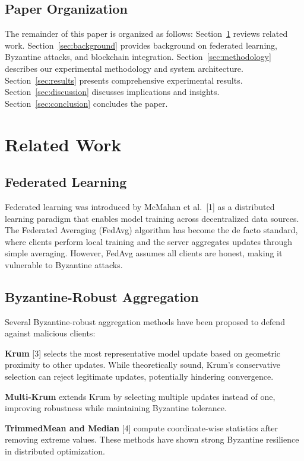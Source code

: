 \documentclass[12pt,a4paper,onecolumn]{article}
\begin{document}
\subsection{Paper Organization}

The remainder of this paper is organized as follows: Section~\ref{sec:related} reviews related work. Section~\ref{sec:background} provides background on federated learning, Byzantine attacks, and blockchain integration. Section~\ref{sec:methodology} describes our experimental methodology and system architecture. Section~\ref{sec:results} presents comprehensive experimental results. Section~\ref{sec:discussion} discusses implications and insights. Section~\ref{sec:conclusion} concludes the paper.

\section{Related Work}
\label{sec:related}

\subsection{Federated Learning}

Federated learning was introduced by McMahan et al.~[1] as a distributed learning paradigm that enables model training across decentralized data sources. The Federated Averaging (FedAvg) algorithm has become the de facto standard, where clients perform local training and the server aggregates updates through simple averaging. However, FedAvg assumes all clients are honest, making it vulnerable to Byzantine attacks.

\subsection{Byzantine-Robust Aggregation}

Several Byzantine-robust aggregation methods have been proposed to defend against malicious clients:

\textbf{Krum} [3] selects the most representative model update based on geometric proximity to other updates. While theoretically sound, Krum's conservative selection can reject legitimate updates, potentially hindering convergence.

\textbf{Multi-Krum} extends Krum by selecting multiple updates instead of one, improving robustness while maintaining Byzantine tolerance.

\textbf{TrimmedMean and Median} [4] compute coordinate-wise statistics after removing extreme values. These methods have shown strong Byzantine resilience in distributed optimization.
\end{document}
